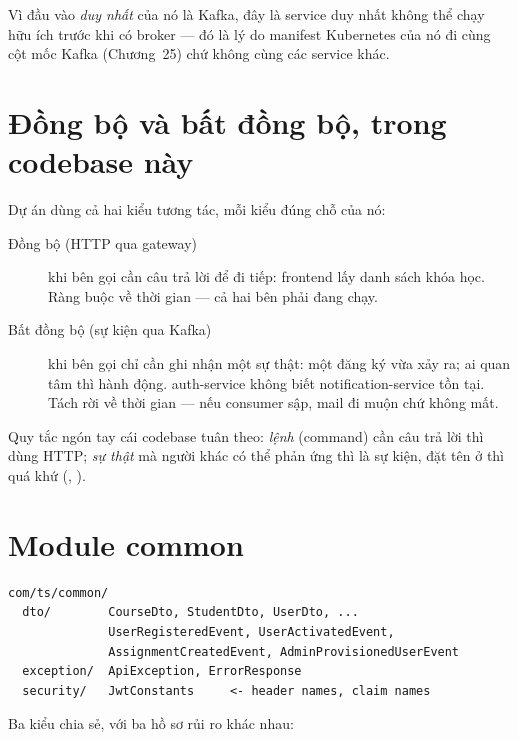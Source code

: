 Vì đầu vào \emph{duy nhất} của nó là Kafka, đây là service duy nhất
không thể chạy hữu ích trước khi có broker --- đó là lý do manifest
Kubernetes của nó đi cùng cột mốc Kafka (Chương~25) chứ không cùng các
service khác.

\section{Đồng bộ và bất đồng bộ, trong codebase này}

Dự án dùng cả hai kiểu tương tác, mỗi kiểu đúng chỗ của nó:

\begin{description}
  \item[Đồng bộ (HTTP qua gateway)] khi bên gọi cần câu trả lời để đi
  tiếp: frontend lấy danh sách khóa học. Ràng buộc về thời gian --- cả
  hai bên phải đang chạy.
  \item[Bất đồng bộ (sự kiện qua Kafka)] khi bên gọi chỉ cần ghi nhận
  một sự thật: một đăng ký vừa xảy ra; ai quan tâm thì hành động.
  auth-service không biết notification-service tồn tại. Tách rời về thời
  gian --- nếu consumer sập, mail đi muộn chứ không mất.
\end{description}

Quy tắc ngón tay cái codebase tuân theo: \emph{lệnh} (command) cần câu
trả lời thì dùng HTTP; \emph{sự thật} mà người khác có thể phản ứng thì
là sự kiện, đặt tên ở thì quá khứ (,
).

\section{Module common}

\begin{lstlisting}
com/ts/common/
  dto/        CourseDto, StudentDto, UserDto, ...
              UserRegisteredEvent, UserActivatedEvent,
              AssignmentCreatedEvent, AdminProvisionedUserEvent
  exception/  ApiException, ErrorResponse
  security/   JwtConstants     <- header names, claim names
\end{lstlisting}

Ba kiểu chia sẻ, với ba hồ sơ rủi ro khác nhau:

